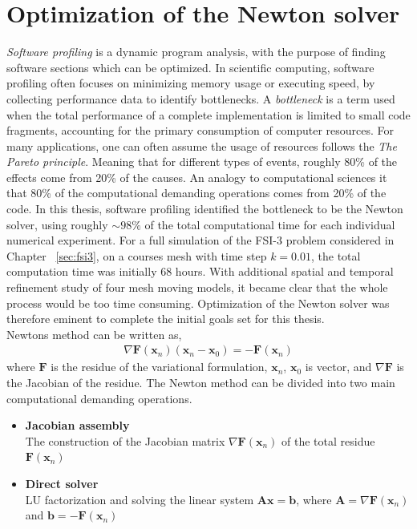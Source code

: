 \section{Optimization of the Newton solver}
\label{sec:opti}
\textit{Software profiling} is a dynamic program analysis, with the purpose of finding software sections which can be optimized. In scientific computing, software profiling often focuses on minimizing memory usage or executing speed, by collecting performance data to identify bottlenecks. A \textit{bottleneck} is a term used when the total performance of a complete implementation is limited to small code fragments, accounting for the primary consumption of computer resources. For many applications, one can often assume the usage of resources follows the \textit{The Pareto principle}. Meaning that for different types of events, roughly 80\% of the effects come from 20\% of the causes. An analogy to computational sciences it that 80\% of the computational demanding operations comes from 20\% of the code. In this thesis, software profiling identified the bottleneck to be the Newton solver, using roughly $\sim 98 \%$ of the total computational time for each individual numerical experiment. For a full simulation of the FSI-3 problem considered in Chapter ~\ref{sec:fsi3}, on a courses mesh with time step $k = 0.01$, the total computation time was initially 68 hours. With additional spatial and temporal refinement study of four mesh moving models, it became clear that the whole process would be too time consuming. Optimization of the Newton solver was therefore eminent to complete the initial goals set for this thesis. \\

Newtons method can be written as,
\begin{align}
\nabla \mathbf{F}(\mathbf{x}_n)(\mathbf{x}_n - \mathbf{x}_0) = - \mathbf{F}(\mathbf{x}_n)
\label{eq:newton}
\end{align}
where $\mathbf{F}$ is the residue of the variational formulation, $\mathbf{x}_n$, $\mathbf{x}_0$ is vector, and $ \nabla \mathbf{F}$ is the Jacobian of the residue. The Newton method can be divided into two main computational demanding operations.

\begin{itemize}
\item \textbf{Jacobian assembly} \\
The construction of the Jacobian matrix $\nabla \mathbf{F}(\mathbf{x}_n)$ of the total residue $\mathbf{F}(\mathbf{x}_n)$
\item \textbf{Direct solver} \\ 
LU factorization and solving the linear system $\mathbf{Ax} = \mathbf{b}$, where $\mathbf{A} = \nabla \mathbf{F}(\mathbf{x}_n)$ and $\mathbf{b} = - \mathbf{F}(\mathbf{x}_n) $
\end{itemize}

